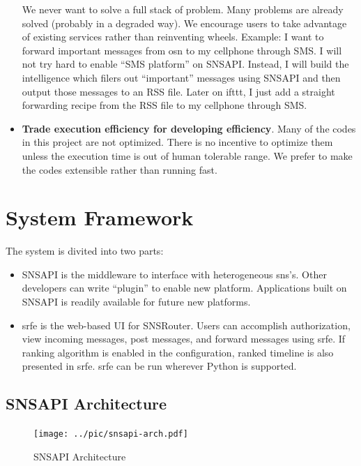 \documentclass{sig-alternate}
\begin{document}
\begin{itemize}
		We never want to solve a full stack of problem. 
		Many problems are already solved (probably in a degraded way). 
		We encourage users to take advantage of existing services
		rather than reinventing wheels. 
		Example: I want to forward important messages from \gls{osn} to 
		my cellphone through SMS. 
		I will not try hard to enable ``SMS platform'' on SNSAPI. 
		Instead, I will build the intelligence which filers out ``important'' messages using SNSAPI
		and then output those messages to an RSS file. 
		Later on ifttt, I just add a straight forwarding recipe from the RSS file 
		to my cellphone through SMS. 
	\item \textbf{Trade execution efficiency for developing efficiency}. 
		Many of the codes in this project are not optimized. 
		There is no incentive to optimize them unless the execution 
		time is out of human tolerable range. 
		We prefer to make the codes extensible rather than running fast. 
\end{itemize}

\section{System Framework}
\label{sec:System Framework}

The system is divited into two parts:
\begin{itemize}
	\item SNSAPI is the middleware to interface with 
		heterogeneous \gls{sns}'s. 
		Other developers can write ``plugin'' to enable new platform. 
		Applications built on SNSAPI is readily available for future new platforms. 
	\item \gls{srfe} is the web-based UI for SNSRouter. 
		Users can accomplish authorization, view incoming messages, post messages, 
		and forward messages using \gls{srfe}. 
		If ranking algorithm is enabled in the configuration, 
		ranked timeline is also presented in \gls{srfe}. 
		\gls{srfe} can be run wherever Python is supported. 
\end{itemize}

\subsection{SNSAPI Architecture}
\label{sec:SNSAPI Architecture}

\begin{figure}[t!]
	\centering
	\texttt{[image: ../pic/snsapi-arch.pdf]}
	\caption{SNSAPI Architecture}
	\label{fig:snsapi-arch}
\end{figure}
\end{document}
